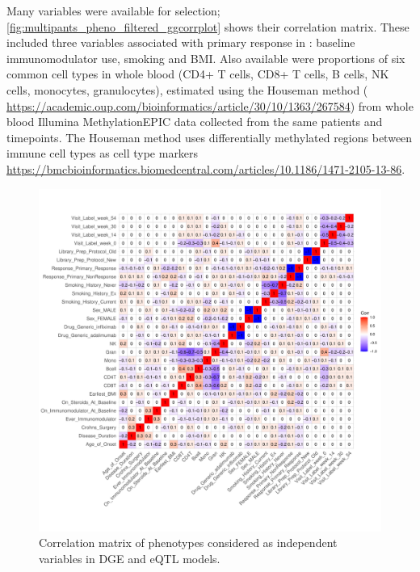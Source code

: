 \begin{outline}
Many variables were available for selection;
\autoref{fig:multipants_pheno_filtered_ggcorrplot} shows their correlation matrix.
These included three variables associated with primary response in \textcite{kennedy2019PredictorsAntiTNFTreatment}: baseline immunomodulator use, smoking and \gls{BMI}.
Also available were proportions of six common cell types in whole blood 
(CD4+ T cells, CD8+ T cells, B cells, NK cells, monocytes, granulocytes),
estimated using the Houseman method ( \url{https://academic.oup.com/bioinformatics/article/30/10/1363/267584})
from whole blood Illumina MethylationEPIC data collected from the same patients and timepoints.
The Houseman method uses differentially methylated regions between immune cell types as cell type markers \url{https://bmcbioinformatics.biomedcentral.com/articles/10.1186/1471-2105-13-86}.

\begin{figure}
    \centering
    \includegraphics[width=1.0\textwidth,page=1]{mainmatter/figures/chapter_04/process_pheno.pheno_filtered_dge.ggcorrplot.pdf}
    \caption{Correlation matrix of phenotypes considered as independent variables in DGE and eQTL models.}
    \label{fig:multipants_pheno_filtered_ggcorrplot}
\end{figure}


\end{outline}
